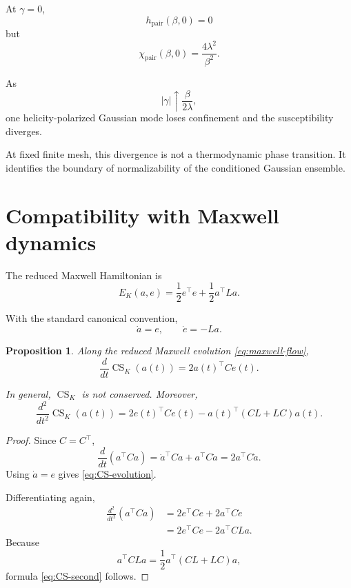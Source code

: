 \documentclass[11pt]{article}
\newtheorem{proposition}[theorem]{Proposition}
\theoremstyle{definition}
\theoremstyle{remark}
\newcommand{\CS}{\operatorname{CS}}
\begin{document}
At \(\gamma=0\),
\begin{equation}
h_{\mathrm{pair}}(\beta,0)=0
\end{equation}
but
\begin{equation}
\chi_{\mathrm{pair}}(\beta,0)
=
\frac{4\lambda^2}{\beta^2}.
\label{eq:paired-zero}
\end{equation}

As
\begin{equation}
|\gamma|
\uparrow
\frac{\beta}{2\lambda},
\end{equation}
one helicity-polarized Gaussian mode loses confinement and
the susceptibility diverges.

At fixed finite mesh, this divergence is not a thermodynamic
phase transition. It identifies the boundary of
normalizability of the conditioned Gaussian ensemble.

\section{Compatibility with Maxwell dynamics}

The reduced Maxwell Hamiltonian is
\begin{equation}
E_K(a,e)
=
\frac12e^\top e
+
\frac12a^\top La.
\end{equation}

With the standard canonical convention,
\begin{equation}
\dot a=e,
\qquad
\dot e=-La.
\label{eq:maxwell-flow}
\end{equation}

\begin{proposition}
\label{prop:dynamics}
Along the reduced Maxwell evolution
\eqref{eq:maxwell-flow},
\begin{equation}
\frac{d}{dt}\CS_K(a(t))
=
2a(t)^\top Ce(t).
\label{eq:CS-evolution}
\end{equation}

In general, \(\CS_K\) is not conserved. Moreover,
\begin{equation}
\frac{d^2}{dt^2}\CS_K(a(t))
=
2e(t)^\top Ce(t)
-
a(t)^\top(CL+LC)a(t).
\label{eq:CS-second}
\end{equation}
\end{proposition}

\begin{proof}
Since \(C=C^\top\),
\begin{equation}
\frac{d}{dt}
\left(
a^\top Ca
\right)
=
\dot a^\top Ca
+
a^\top C\dot a
=
2a^\top C\dot a.
\end{equation}
Using \(\dot a=e\) gives
\eqref{eq:CS-evolution}.

Differentiating again,
\begin{align}
\frac{d^2}{dt^2}
\left(
a^\top Ca
\right)
&=
2e^\top Ce
+
2a^\top C\dot e
\nonumber\\
&=
2e^\top Ce
-
2a^\top CLa.
\end{align}
Because
\begin{equation}
a^\top CLa
=
\frac12
a^\top(CL+LC)a,
\end{equation}
formula \eqref{eq:CS-second} follows.
\end{proof}
\end{document}
